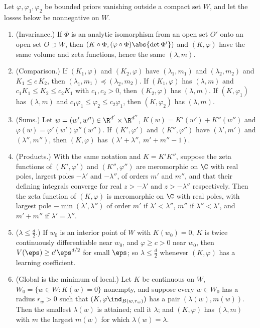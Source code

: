 \begin{refsection}
\begin{proposition}\label{prop:blowups:rules}
Let $\varphi,\varphi_1,\varphi_2$ be bounded priors vanishing outside a compact set $W$, and let the losses below be nonnegative on $W$.
\begin{enumerate}
\item (Invariance.) If $\Phi$ is an analytic isomorphism from an open set $O'$ onto an open set $O\supset W$, then $(K\circ\Phi,(\varphi\circ\Phi)\abs{\det\Phi'})$ and $(K,\varphi)$ have the same volume and zeta functions, hence the same $(\lambda,m)$.
\item (Comparison.) If $(K_1,\varphi)$ and $(K_2,\varphi)$ have $(\lambda_1,m_1)$ and $(\lambda_2,m_2)$ and $K_1\le c\,K_2$, then $(\lambda_1,m_1)\preceq(\lambda_2,m_2)$. If $(K_1,\varphi)$ has $(\lambda,m)$ and $c_1K_1\le K_2\le c_2K_1$ with $c_1,c_2>0$, then $(K_2,\varphi)$ has $(\lambda,m)$. If $(K,\varphi_1)$ has $(\lambda,m)$ and $c_1\varphi_1\le\varphi_2\le c_2\varphi_1$, then $(K,\varphi_2)$ has $(\lambda,m)$.
\item (Sums.) Let $w=(w',w'')\in\R^{d'}\times\R^{d''}$, $K(w)=K'(w')+K''(w'')$ and $\varphi(w)=\varphi'(w')\varphi''(w'')$. If $(K',\varphi')$ and $(K'',\varphi'')$ have $(\lambda',m')$ and $(\lambda'',m'')$, then $(K,\varphi)$ has $(\lambda'+\lambda'',\,m'+m''-1)$.
\item (Products.) With the same notation and $K=K'K''$, suppose the zeta functions of $(K',\varphi')$ and $(K'',\varphi'')$ are meromorphic on $\C$ with real poles, largest poles $-\lambda'$ and $-\lambda''$, of orders $m'$ and $m''$, and that their defining integrals converge for real $z>-\lambda'$ and $z>-\lambda''$ respectively. Then the zeta function of $(K,\varphi)$ is meromorphic on $\C$ with real poles, with largest pole $-\min(\lambda',\lambda'')$ of order $m'$ if $\lambda'<\lambda''$, $m''$ if $\lambda''<\lambda'$, and $m'+m''$ if $\lambda'=\lambda''$.
\item ($\lambda\le\frac d2$.) If $w_0$ is an interior point of $W$ with $K(w_0)=0$, $K$ is twice continuously differentiable near $w_0$, and $\varphi\ge c>0$ near $w_0$, then $V(\eps)\ge c'\eps^{d/2}$ for small $\eps$; so $\lambda\le\frac d2$ whenever $(K,\varphi)$ has a learning coefficient.
\item (Global is the minimum of local.) Let $K$ be continuous on $W$, $W_0=\{w\in W:K(w)=0\}$ nonempty, and suppose every $w\in W_0$ has a radius $r_w>0$ such that $(K,\varphi\ind_{B(w,r_w)})$ has a pair $(\lambda(w),m(w))$. Then the smallest $\lambda(w)$ is attained; call it $\lambda$; and $(K,\varphi)$ has $(\lambda,m)$ with $m$ the largest $m(w)$ for which $\lambda(w)=\lambda$.
\end{enumerate}
\end{proposition}


\end{refsection}

